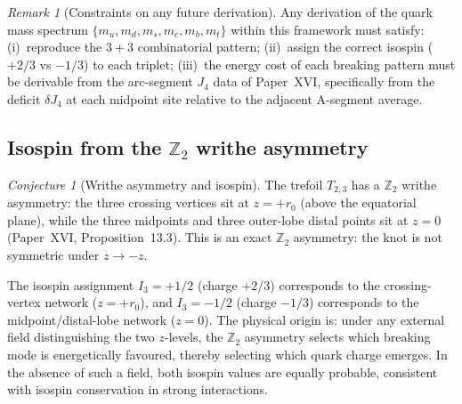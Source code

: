 \documentclass[11pt,a4paper]{article}
\theoremstyle{definition}\newtheorem{definition}[theorem]{Definition}
\theoremstyle{remark}
\newtheorem{remark}[theorem]{Remark}
\newtheorem{conjecture}[theorem]{Conjecture}
\newcommand{\Ztwo}{\mathbb{Z}_2}
\begin{document}
\begin{remark}[Constraints on any future derivation]
\label{P18:rem:quark_constraint}
Any derivation of the quark mass spectrum $\{m_u,m_d,m_s,m_c,m_b,m_t\}$
within this framework must satisfy:
(i)~reproduce the $3+3$ combinatorial pattern;
(ii)~assign the correct isospin ($+2/3$ vs $-1/3$) to each triplet;
(iii)~the energy cost of each breaking pattern must be derivable
from the arc-segment $J_4$ data of Paper~XVI, specifically from
the deficit $\delta J_4$ at each midpoint site relative to the
adjacent A-segment average.
\end{remark}

\subsection{Isospin from the $\Ztwo$ writhe asymmetry}
\label{P18:sec:isospin}

\begin{conjecture}[Writhe asymmetry and isospin]
\label{P18:conj:isospin}
The trefoil $T_{2,3}$ has a $\Ztwo$ writhe asymmetry: the three
crossing vertices sit at $z=+r_0$ (above the equatorial plane),
while the three midpoints and three outer-lobe distal points sit
at $z=0$ (Paper~XVI, Proposition~13.3).  %
This is an exact $\Ztwo$ asymmetry: the knot is not symmetric under
$z\to-z$.

The isospin assignment $I_3=+1/2$ (charge $+2/3$) corresponds to
the crossing-vertex network ($z=+r_0$), and $I_3=-1/2$ (charge
$-1/3$) corresponds to the midpoint/distal-lobe network ($z=0$).
The physical origin is: under any external field distinguishing
the two $z$-levels, the $\Ztwo$ asymmetry selects which breaking
mode is energetically favoured, thereby selecting which quark
charge emerges.  In the absence of such a field, both isospin
values are equally probable, consistent with isospin conservation
in strong interactions.
\end{conjecture}
\end{document}
